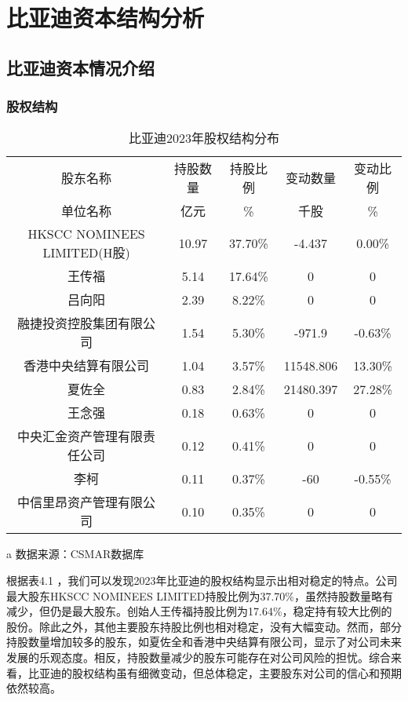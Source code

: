 \chapter{比亚迪资本结构分析}


\section{比亚迪资本情况介绍}


\subsection{股权结构}
\begin{table}
  \centering
  \begin{threeparttable}[c]
    \caption{比亚迪2023年股权结构分布}
    \label{tab:equity-structure}
    \begin{tabular}{ccccc}
      \toprule
        股东名称 & 持股数量 & 持股比例 & 变动数量 & 变动比例 \\ 
        单位名称 & 亿元    &  \%      &  千股   &  \%      \\
      \midrule
        HKSCC NOMINEES LIMITED(H股) & 10.97  & 37.70\% & -4.437 & 0.00\% \\ 
        王传福 & 5.14  & 17.64\% & 0 & 0 \\ 
        吕向阳 & 2.39  & 8.22\% & 0 & 0 \\ 
        融捷投资控股集团有限公司 & 1.54  & 5.30\% & -971.9 & -0.63\% \\ 
        香港中央结算有限公司 & 1.04  & 3.57\% & 11548.806 & 13.30\% \\ 
        夏佐全 & 0.83  & 2.84\% & 21480.397 & 27.28\% \\ 
        王念强 & 0.18  & 0.63\% & 0 & 0 \\ 
        中央汇金资产管理有限责任公司 & 0.12  & 0.41\% & 0 & 0 \\ 
        李柯 & 0.11  & 0.37\% & -60 & -0.55\% \\ 
        中信里昂资产管理有限公司 & 0.10  & 0.35\% & 0 & 0 \\ 
      \bottomrule
    \end{tabular}
    \begin{tablenotes}
      \item [a] 数据来源：CSMAR数据库
    \end{tablenotes}
  \end{threeparttable}
\end{table}
根据表4.1 ，我们可以发现2023年比亚迪的股权结构显示出相对稳定的特点。公司最大股东HKSCC NOMINEES LIMITED持股比例为37.70\%，虽然持股数量略有减少，但仍是最大股东。创始人王传福持股比例为17.64\%，稳定持有较大比例的股份。除此之外，其他主要股东持股比例也相对稳定，没有大幅变动。然而，部分持股数量增加较多的股东，如夏佐全和香港中央结算有限公司，显示了对公司未来发展的乐观态度。相反，持股数量减少的股东可能存在对公司风险的担忧。综合来看，比亚迪的股权结构虽有细微变动，但总体稳定，主要股东对公司的信心和预期依然较高。
